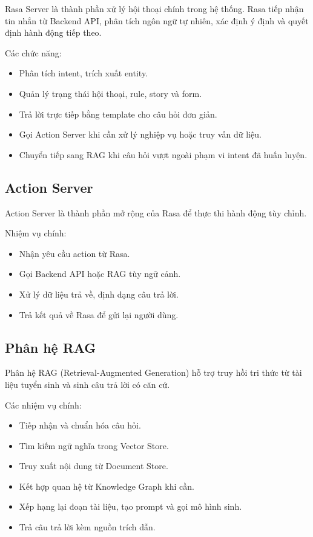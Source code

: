 \documentclass[12pt,a4paper]{report}
\begin{document}
Rasa Server là thành phần xử lý hội thoại chính trong hệ thống. Rasa tiếp nhận tin nhắn từ Backend API, phân tích ngôn ngữ tự nhiên, xác định ý định và quyết định hành động tiếp theo.

Các chức năng:
\begin{itemize}
    \item Phân tích intent, trích xuất entity.
    \item Quản lý trạng thái hội thoại, rule, story và form.
    \item Trả lời trực tiếp bằng template cho câu hỏi đơn giản.
    \item Gọi Action Server khi cần xử lý nghiệp vụ hoặc truy vấn dữ liệu.
    \item Chuyển tiếp sang RAG khi câu hỏi vượt ngoài phạm vi intent đã huấn luyện.
\end{itemize}

\subsection{Action Server}

Action Server là thành phần mở rộng của Rasa để thực thi hành động tùy chỉnh.

Nhiệm vụ chính:
\begin{itemize}
    \item Nhận yêu cầu action từ Rasa.
    \item Gọi Backend API hoặc RAG tùy ngữ cảnh.
    \item Xử lý dữ liệu trả về, định dạng câu trả lời.
    \item Trả kết quả về Rasa để gửi lại người dùng.
\end{itemize}

\subsection{Phân hệ RAG}

Phân hệ RAG (Retrieval-Augmented Generation) hỗ trợ truy hồi tri thức từ tài liệu tuyển sinh và sinh câu trả lời có căn cứ.

Các nhiệm vụ chính:
\begin{itemize}
    \item Tiếp nhận và chuẩn hóa câu hỏi.
    \item Tìm kiếm ngữ nghĩa trong Vector Store.
    \item Truy xuất nội dung từ Document Store.
    \item Kết hợp quan hệ từ Knowledge Graph khi cần.
    \item Xếp hạng lại đoạn tài liệu, tạo prompt và gọi mô hình sinh.
    \item Trả câu trả lời kèm nguồn trích dẫn.
\end{itemize}
\end{document}
